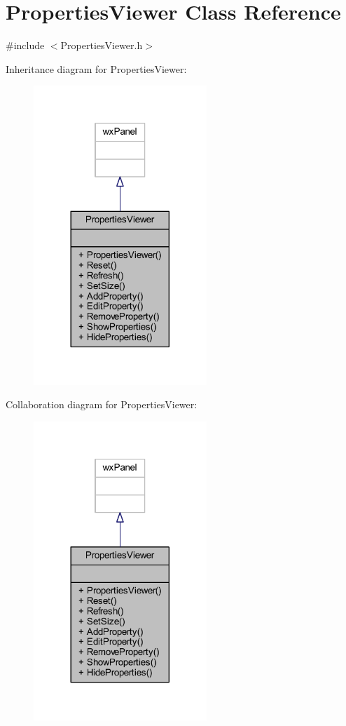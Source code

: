 \hypertarget{class_properties_viewer}{}\section{Properties\+Viewer Class Reference}
\label{class_properties_viewer}


{\ttfamily \#include $<$Properties\+Viewer.\+h$>$}



Inheritance diagram for Properties\+Viewer\+:\nopagebreak
\begin{figure}[H]
\begin{center}
\leavevmode
\includegraphics[width=185pt]{class_properties_viewer__inherit__graph}
\end{center}
\end{figure}


Collaboration diagram for Properties\+Viewer\+:\nopagebreak
\begin{figure}[H]
\begin{center}
\leavevmode
\includegraphics[width=185pt]{class_properties_viewer__coll__graph}
\end{center}
\end{figure}
